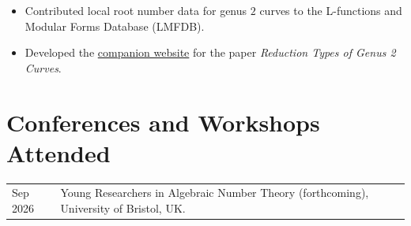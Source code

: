 \documentclass[a4paper,11pt]{article}
\makeatletter
\newcommand{\datedentry}[2]{%
  \begin{tabularx}{\textwidth}{
    @{}>{\raggedleft\arraybackslash}p{2.25cm}
    @{\hspace{0.45cm}}X@{}}
    #1 & #2
  \end{tabularx}\par\vspace{0.5pt}
}
\newcommand{\talk}[3]{%
  \datedentry{#3}{\textit{#1}. #2.}
}
\newcommand{\conference}[3]{%
  \datedentry{#1}{#2, #3.}
  \vspace{1pt}
}
\makeatother
\begin{document}
\begin{itemize}
  \item Contributed local root number data for genus $2$ curves to the
    L-functions and Modular Forms Database (LMFDB).
  \item Developed the
    \href{https://elviralupoian.github.io/genus2reductiontypes/}
      {companion website}  for the paper
    \textit{Reduction Types of Genus 2 Curves}.
\end{itemize}











\section{Conferences and Workshops Attended}


\conference{Sep 2026}
  {Young Researchers in Algebraic Number Theory (forthcoming)}
  {University of Bristol, UK}
\end{document}
